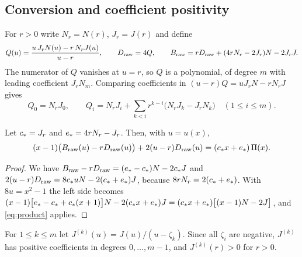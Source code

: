 \subsection{Conversion and coefficient positivity}
For \(r>0\) write \(N_r=N(r)\), \(J_r=J(r)\) and define
\begin{equation}\label{eq:conversion}
 Q(u)=\frac{u\,J_rN(u)-r\,N_rJ(u)}{u-r},\qquad
 D_{\mathrm{raw}}=4Q,\qquad
 B_{\mathrm{raw}}=rD_{\mathrm{raw}}+(4rN_r-2J_r)N-2J_rJ .
\end{equation}
The numerator of \(Q\) vanishes at \(u=r\), so \(Q\) is a polynomial, of degree \(m\) with
leading coefficient \(J_rN_m\). Comparing coefficients in \((u-r)Q=uJ_rN-rN_rJ\) gives
\begin{equation}\label{eq:qformula}
 Q_0=N_rJ_0,\qquad Q_i=N_rJ_i+\sum_{k<i}r^{k-i}\bigl(N_rJ_k-J_rN_k\bigr)\quad(1\le i\le m).
\end{equation}

\begin{lemma}\label{lem:identity}
Let \(c_\ast=J_r\) and \(e_\ast=4rN_r-J_r\). Then, with \(u=u(x)\),
\begin{equation}\label{eq:interpolation}
 (x-1)\bigl(B_{\mathrm{raw}}(u)-rD_{\mathrm{raw}}(u)\bigr)+2(u-r)D_{\mathrm{raw}}(u)=(c_\ast x+e_\ast)\,\Pi(x).
\end{equation}
\end{lemma}
\begin{proof}
We have \(B_{\mathrm{raw}}-rD_{\mathrm{raw}}=(e_\ast-c_\ast)N-2c_\ast J\) and
\(2(u-r)D_{\mathrm{raw}}=8c_\ast uN-2(c_\ast+e_\ast)J\), because \(8rN_r=2(c_\ast+e_\ast)\). With \(8u=x^2-1\) the
left side becomes
\((x-1)\bigl[e_\ast-c_\ast+c_\ast(x+1)\bigr]N-2(c_\ast x+e_\ast)J=(c_\ast x+e_\ast)\bigl[(x-1)N-2J\bigr]\), and
\eqref{eq:product} applies.
\end{proof}

For \(1\le k\le m\) let \(J^{(k)}(u)=J(u)/(u-\zeta_k)\). Since all \(\zeta_i\) are negative,
\(J^{(k)}\) has positive coefficients in degrees \(0,\dots,m-1\), and \(J^{(k)}(r)>0\) for
\(r>0\).


